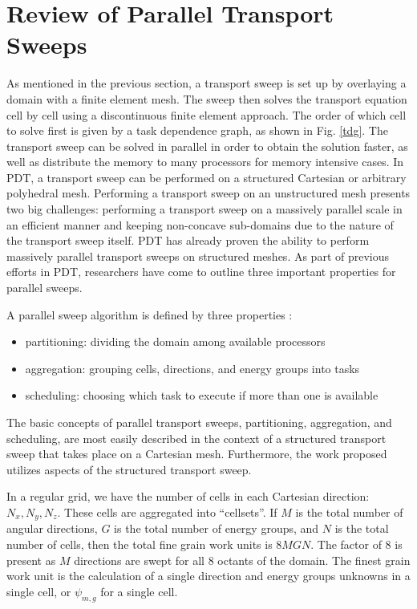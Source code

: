 \documentclass[11pt, letterpaper,titlepage,oneside]{article}
\begin{document}
\section{Review of Parallel Transport Sweeps}

As mentioned in the previous section, a transport sweep is set up by overlaying a domain with a finite element mesh. The sweep then solves the transport equation cell by cell using a discontinuous finite element approach. The order of which cell to solve first is given by a task dependence graph, as shown in Fig. \ref{tdg}. The transport sweep can be solved in parallel in order to obtain the solution faster, as well as distribute the memory to many processors for memory intensive cases. In PDT, a transport sweep can be performed on a structured Cartesian or arbitrary polyhedral mesh. Performing a transport sweep on an unstructured mesh presents two big challenges: performing a transport sweep on a massively parallel scale in an efficient manner and keeping non-concave sub-domains due to the nature of the transport sweep itself. PDT has already proven the ability to perform massively parallel transport sweeps on structured meshes. As part of previous efforts in PDT, researchers have come to outline three important properties for parallel sweeps. 

A parallel sweep algorithm is defined by three properties\cite{mpadams2013} :
\begin{itemize}
\item partitioning: dividing the domain among available processors
\item aggregation: grouping cells, directions, and energy groups into tasks
\item scheduling: choosing which task to execute if more than one is available
\end{itemize}

The basic concepts of parallel transport sweeps, partitioning, aggregation, and scheduling, are most easily described in the context of a structured transport sweep that takes place on a Cartesian mesh. Furthermore, the work proposed utilizes aspects of the structured transport sweep.

In a regular grid, we have the  number of cells in each Cartesian direction: $N_x, N_y, N_z$. These cells are aggregated into ``cellsets''. If $M$ is the total number of angular directions, $G$ is the total number of energy groups, and $N$ is the total number of cells, then the total fine grain work units is $8MGN$. The factor of 8 is present as $M$ directions are swept for all 8 octants of the domain. The finest grain work unit is the calculation of a single direction and energy groups unknowns in a single cell, or $\psi_{m,g}$ for a single cell.
\end{document}
